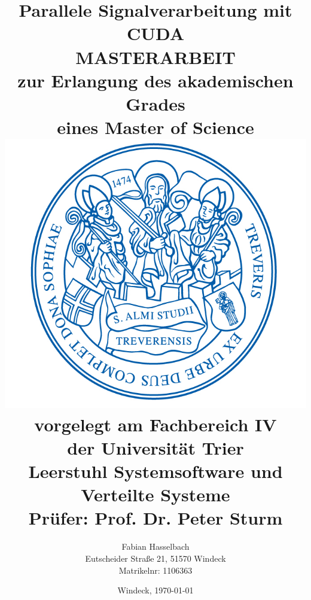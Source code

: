 
\title{ \normalsize \textsc{}
	\LARGE \textbf{Parallele Signalverarbeitung mit CUDA}   \\ [1.5cm]
	\Large MASTERARBEIT	\\ [0.5cm]
	\Large zur Erlangung des akademischen Grades \\ eines Master of Science \\ [1cm]
	
	\includegraphics[scale=1]{Siegel_2015.jpg}
	\\ [1cm]
	
	\Large vorgelegt am Fachbereich IV \\
	\Large der Universität Trier \\ 
	\Large Leerstuhl Systemsoftware und Verteilte Systeme \\ [0.5cm]
	\Large Prüfer: Prof. Dr. Peter Sturm
}



\author{
	Fabian Hasselbach \\ 
	Eutscheider Straße 21, 51570 Windeck \\
	Matrikelnr: 1106363
}

\date{
	\normalsize Windeck, \today \vspace*{1\baselineskip}
}
\maketitle
\newpage
\tableofcontents	
\newpage

\setcounter{page}{1} 		%